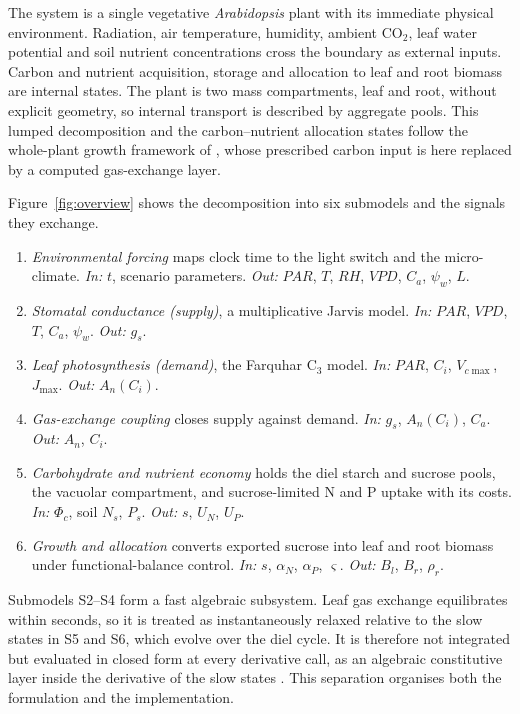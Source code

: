 The system is a single vegetative \textit{Arabidopsis} plant with its immediate
physical environment. Radiation, air temperature, humidity, ambient CO$_2$, leaf
water potential and soil nutrient concentrations cross the boundary as external
inputs. Carbon and nutrient acquisition, storage and allocation to leaf and root
biomass are internal states. The plant is two mass compartments, leaf and root,
without explicit geometry, so internal transport is described by aggregate
pools. This lumped decomposition and the carbon--nutrient allocation states
follow the whole-plant growth framework of \citet{Tedone2020}, whose prescribed
carbon input is here replaced by a computed gas-exchange layer.

Figure~\ref{fig:overview} shows the decomposition into six submodels and the
signals they exchange.
\begin{enumerate}\itemsep2pt
\item[\textbf{S1}] \emph{Environmental forcing} maps clock time to the light switch
      and the micro-climate. \emph{In:} $t$, scenario parameters. \emph{Out:}
      $\mathit{PAR}$, $T$, $\mathit{RH}$, $\mathit{VPD}$, $C_a$, $\psi_w$, $L$.
\item[\textbf{S2}] \emph{Stomatal conductance (supply)}, a multiplicative Jarvis
      model. \emph{In:} $\mathit{PAR}$, $\mathit{VPD}$, $T$, $C_a$, $\psi_w$.
      \emph{Out:} $g_s$.
\item[\textbf{S3}] \emph{Leaf photosynthesis (demand)}, the Farquhar C$_3$ model.
      \emph{In:} $\mathit{PAR}$, $C_i$, $V_{c\max}$, $J_{\max}$. \emph{Out:}
      $A_n(C_i)$.
\item[\textbf{S4}] \emph{Gas-exchange coupling} closes supply against demand.
      \emph{In:} $g_s$, $A_n(C_i)$, $C_a$. \emph{Out:} $A_n$, $C_i$.
\item[\textbf{S5}] \emph{Carbohydrate and nutrient economy} holds the diel starch
      and sucrose pools, the vacuolar compartment, and sucrose-limited N and P
      uptake with its costs. \emph{In:} $\Phi_c$, soil $N_s$, $P_s$. \emph{Out:}
      $s$, $U_N$, $U_P$.
\item[\textbf{S6}] \emph{Growth and allocation} converts exported sucrose into
      leaf and root biomass under functional-balance control. \emph{In:} $s$,
      $\alpha_N$, $\alpha_P$, $\varsigma$. \emph{Out:} $B_l$, $B_r$, $\rho_r$.
\end{enumerate}

Submodels S2--S4 form a fast algebraic subsystem. Leaf gas exchange equilibrates
within seconds, so it is treated as instantaneously relaxed relative to the slow
states in S5 and S6, which evolve over the diel cycle. It is therefore not
integrated but evaluated in closed form at every derivative call, as an
algebraic constitutive layer inside the derivative of the slow states
\citep{Cellier1991,Zeigler2000}. This separation organises both the formulation
and the implementation.

